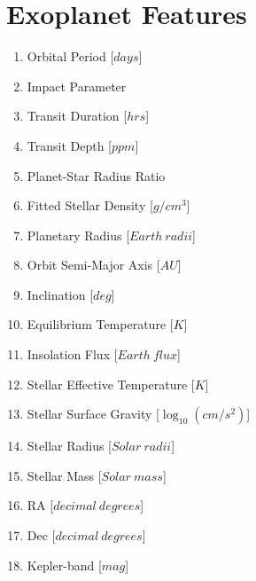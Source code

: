 \documentclass[11pt, a4paper]{article}
\begin{document}
\section{Exoplanet Features}
  \label{appendix:features}
  \begin{multicols}{2}
    \begin{enumerate}
      \item Orbital Period [$days$]
      \item Impact Parameter
      \item Transit Duration [$hrs$]
      \item Transit Depth [$ppm$]
      \item Planet-Star Radius Ratio
      \item Fitted Stellar Density [$g/cm^{3}$]
      \item Planetary Radius [$Earth\:radii$]
      \item Orbit Semi-Major Axis [$AU$]
      \item Inclination [$deg$]
      \item Equilibrium Temperature [$K$]
      \item Insolation Flux [$Earth\:flux$]
      \item Stellar Effective Temperature [$K$]
      \item Stellar Surface Gravity [$\log_{10}(cm/s^{2})$]
      \item Stellar Radius [$Solar\:radii$]
      \item Stellar Mass [$Solar\:mass$]
      \item RA [$decimal\:degrees$]
      \item Dec [$decimal\:degrees$]
      \item Kepler-band [$mag$]
    \end{enumerate}
  \end{multicols}



\end{document}
